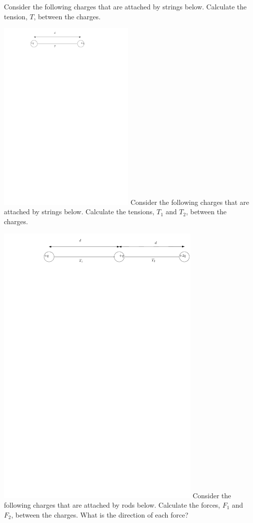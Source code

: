 \documentclass[12pt]{article}
\begin{document}
\pagestyle{empty}
\noindent Consider the following charges that are attached by strings below.  Calculate the tension, $T$, between the charges.

\includegraphics[width=0.5\textwidth]{2-charges.pdf}
\newpage
\noindent Consider the following charges that are attached by strings below.  Calculate the tensions, $T_1$ and $T_2$, between the charges.

\includegraphics[width=0.75\textwidth]{3-charges.pdf}
\newpage 
\noindent Consider the following charges that are attached by rods below.  Calculate the forces, $F_1$ and $F_2$, between the charges.  What is the direction of each force? 
\end{document}

